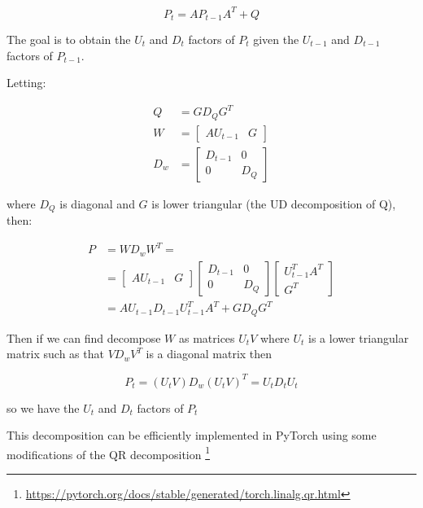 \documentclass{article}
\newcounter{subsubparagraph}
\begin{document}
$$ P_t = AP_{t-1}A^T + Q$$

The goal is to obtain the $U_t$ and $D_t$ factors of $P_t$ given the $U_{t-1}$ and $D_{t-1}$ factors of $P_{t-1}$.

Letting:

\begin{align}
    Q &= GD_QG^T\\
    W &= \begin{bmatrix}AU_{t-1}&G\end{bmatrix}\\
    D_w &= \begin{bmatrix}D_{t-1} & 0 \\ 0& D_Q \end{bmatrix}
\end{align}

where $D_Q$ is diagonal and $G$ is lower triangular (the UD decomposition of Q), then:

\begin{equation}
\begin{split}
   P &= WD_wW^T = \\
&=\begin{bmatrix}AU_{t-1}&G\end{bmatrix}\begin{bmatrix}D_{t-1} & 0 \\ 0& D_Q \end{bmatrix}\begin{bmatrix}U^T_{t-1}A^T\\G^T\end{bmatrix} \\
&= AU_{t-1}D_{t-1}U^T_{t-1}A^T + GD_QG^T  
\end{split}
\end{equation}

Then if we can find decompose $W$ as matrices $U_tV$ where $U_t$ is a lower triangular matrix such as that $VD_wV^T$ is a diagonal matrix then

\begin{equation}
    P_t = (U_tV)D_w(U_tV)^T = U_tD_tU_t
\end{equation}

so we have the $U_t$ and $D_t$ factors of $P_t$

This decomposition can be efficiently implemented in PyTorch using some modifications of the QR decomposition \footnote{\url{https://pytorch.org/docs/stable/generated/torch.linalg.qr.html}}

\end{document}

